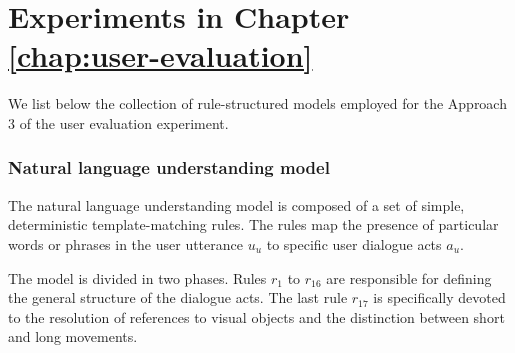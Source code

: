 \section{Experiments in Chapter \ref{chap:user-evaluation}}
\label{sec:domainspecs-usereval}

We list below the collection of rule-structured models employed for the Approach 3 of the user evaluation experiment. 

\subsubsection*{Natural language understanding model}

The natural language understanding model is composed of a set of simple, deterministic template-matching rules.  The rules map the presence of particular words or phrases in the user utterance $u_u$ to specific user dialogue acts $a_u$. 

The model is divided in two phases.  Rules $r_1$ to $r_{16}$ are responsible for defining the general structure of the dialogue acts.  The last rule $r_{17}$ is specifically devoted to the resolution of references to visual objects and the distinction between short and long movements. 

